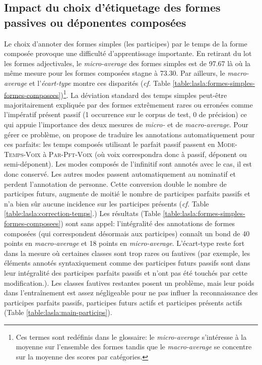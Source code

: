 \subsection{Impact du choix d'étiquetage des formes passives ou déponentes composées}
\label{subsec:training:lasla-modification}

Le choix d'annoter des formes simples (les participes) par le temps de la forme composée provoque une difficulté d'apprentissage importante. En retirant du lot les formes adjectivales, le \textit{micro-average} des formes simples est de 97.67 là où la même mesure pour les formes composées stagne à 73.30. Par ailleurs, le \textit{macro-average} et l'\textit{écart-type} montre ces disparités (\textit{cf.} Table \ref{table:lasla:formes-simples-formes-composees})\footnote{Ces termes sont redéfinis dans le glossaire: le \textit{micro-average} s'intéresse à la moyenne sur l'ensemble des formes tandis que le \textit{macro-average} se concentre sur la moyenne des scores par catégories.}. La déviation standard des temps simples peut-être majoritairement expliquée par des formes extrêmement rares ou erronées comme l'impératif présent passif (1 occurrence sur le corpus de test, 0 de précision) ce qui appuie l'importance des deux mesures de \textit{micro-} et de \textit{macro-average}. Pour gérer ce problème, on propose de traduire les annotations automatiquement pour ces parfaits: les temps composés utilisant le parfait passif passent en \textsc{Mode-Temps-Voix} à \textsc{Par-Pft-Voix} (où voix correspondra donc à passif, déponent ou semi-déponent). Les modes composés de l'infinitif sont annotés avec le cas, il est donc conservé. Les autres modes passent automatiquement au nominatif et perdent l'annotation de personne. Cette conversion double le nombre de participes futurs, augmente de moitié le nombre de participes parfaits passifs et n'a bien sûr aucune incidence sur les participes présents (\textit{cf.} Table \ref{table:lasla:correction-temps}.) Les résultats (Table \ref{table:lasla:formes-simples-formes-composees}) sont sans appel: l'intégralité des annotations de formes composées (qui correspondent désormais aux participes) connaît un bond de 40 points en \textit{macro-average} et 18 points en \textit{micro-average}. L'écart-type reste fort dans la mesure où certaines classes sont trop rares ou fautives (par exemple, les éléments annotés syntaxiquement comme des participes futurs passifs sont dans leur intégralité des participes parfaits passifs et n'ont pas été touchés par cette modification.). Les classes fautives restantes posent un problème, mais leur poids dans l'entraînement est assez négligeable pour ne pas influer la reconnaissance des participes parfaits passifs, participes futurs actifs et participes présents actifs (Table \ref{table:lasla:main-particips}).

